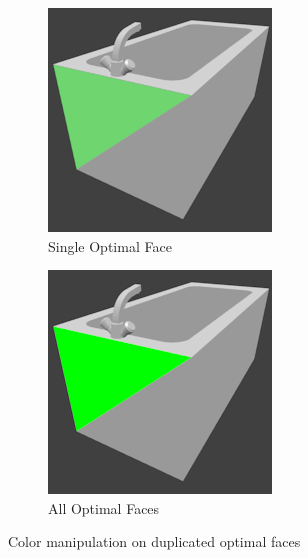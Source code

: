 \begin{figure}
	\centering
	\begin{subfigure}{.49\textwidth}
		\centering
		\includegraphics[width=.7\textwidth]{images/optimal_face_single.png}
		\caption{Single Optimal Face}
		\label{fig:optimal-face-single}
	\end{subfigure}
	\begin{subfigure}{.49\textwidth}
		\centering
		\includegraphics[width=.7\textwidth]{images/optimal_face_all.png}
		\caption{All Optimal Faces}
		\label{fig:optimal-face-all}
	\end{subfigure}
	\caption{Color manipulation on duplicated optimal faces}
	\label{fig:optimal-face}
\end{figure}

